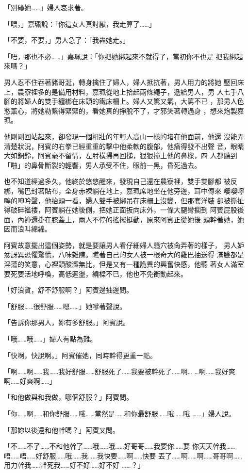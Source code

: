 「別碰她……」婦人哀求著。

「喂，」嘉珮說：「你這女人真討厭，我走算了……」

「不要，不要，」男人急了：「我轟她走。」

「唔，那也不必……」嘉珮說：「你把她綁起來不就得了，當初你不也是
把我綁起來嗎？」

男人忍不住吞著豬哥涎，轉身擒住了婦人，婦人抵抗著，男人用力的將她
壓回床上，農寮裡多的是備用材料，嘉珮從地上拾起兩條繩子，遞給男人，男
人七手八腳的將婦人的雙手纏綁在床頭的鐵床柵上。婦人又驚又氣，大罵不已
，那男人色慾薰心，將她勒繫得緊緊的，看她真的掙脫不了，才邪笑著轉過身
，想來炮製嘉珮。

他剛剛回站起來，卻發現一個粗壯的年輕人高山一樣的堵在他面前，他還
沒能弄清楚狀況，阿賓的右拳已經重重的擊中他柔軟的腹部，他痛得發不出聲
音，眼睛大如銅鈴，阿賓毫不留情，左肘橫掃再回搥，狠狠撞上他的鼻樑，四
人都聽到「啪」的鼻骨斷裂的輕響，男人承受不住，眼前一黑，昏死過去。

也不知道經過多久，他終於悠悠醒來，發現自己還在農寮裡，雙手雙腳都
被反綁，嘴巴封著貼布，全身赤裸躺在地上，嘉珮席地坐在他旁邊，耳中傳來
嚶嚶嚀嚀的呻吟聲，他抬頭一看，婦人雙手被綁吊在床柵上沒變，但那套洋裝
卻被撕扯得破碎襤褸，阿賓躺在她後側，把她正面扳向床外，一條大腿彎擱到
阿賓屁股後面，內褲還掛在膝蓋上，兩人不停的搖擺挺動，原來阿賓正從她後
頭幹著她，她因而浪叫綿綿。

阿賓故意擺出這個姿勢，就是要讓男人看仔細婦人騷穴被肏弄著的樣子，
男人妒忿訝異恐懼驚慌，八味雜陳。瞧著自己的女人被一根奇大的雞巴抽送得
滿臉都是淫蕩的笑意，心裡頭酸澀無比，但是又有一種詭異的興奮快感，他聽
著女人滿室要死要活地呼喚，高低迴盪，繞樑不已，他也不免衝動起來。

「好浪貨，舒不舒服啊？」阿賓邊抽邊問。

「舒服……很舒服……嗯……」她嗲著聲說。

「告訴你那男人，妳有多舒服。」阿賓說。

「哦……哦……」婦人有點為難。

「快啊，快說啊。」阿賓催她，同時幹得更重一點。

「啊……啊……我……我好舒服……舒服死了……我要被幹死了……啊…
…啊……我好爽啊……好爽啊……」

「和他做與和我做，哪個舒服？」阿賓問。

「你……啊……和你舒服……哦……當然是……和你最舒服……哦……哦
……」婦人說。

「那妳以後還和他幹嗎？」阿賓又問。

「不……不了……不和他幹了……哦……哦……好哥哥……我要你……要
你天天幹我……唔……唔……好舒服……哦……我……我快要……啊……快要
丟了……啊……啊……哥哥啊……用力幹我……幹死我……好不好……好不好
……？」

